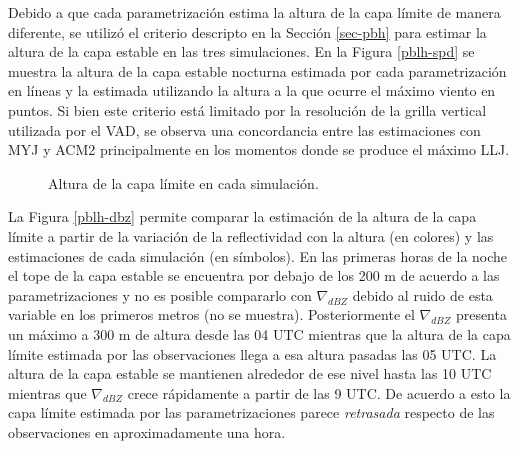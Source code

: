 \documentclass[12pt,spanish,oneside, a4paper]{book}
\begin{document}
Debido a que cada parametrización estima la altura de la capa límite de
manera diferente, se utilizó el criterio descripto en la Sección
\ref{sec-pbh} para estimar la altura de la capa estable en las tres
simulaciones. En la Figura \ref{pblh-spd} se muestra la altura de la
capa estable nocturna estimada por cada parametrización en líneas y la
estimada utilizando la altura a la que ocurre el máximo viento en
puntos. Si bien este criterio está limitado por la resolución de la
grilla vertical utilizada por el VAD, se observa una concordancia entre
las estimaciones con MYJ y ACM2 principalmente en los momentos donde se
produce el máximo LLJ.

\begin{figure}

{\centering {}\newline{}

}

\caption{Altura de la capa límite en cada simulación. \label{pblh-wrf}}\label{fig:pblh-wrf}
\end{figure}

La Figura \ref{pblh-dbz} permite comparar la estimación de la altura de
la capa límite a partir de la variación de la reflectividad con la
altura (en colores) y las estimaciones de cada simulación (en símbolos).
En las primeras horas de la noche el tope de la capa estable se
encuentra por debajo de los 200 m de acuerdo a las parametrizaciones y
no es posible compararlo con \(\nabla_{dBZ}\) debido al ruido de esta
variable en los primeros metros (no se muestra). Posteriormente el
\(\nabla_{dBZ}\) presenta un máximo a 300 m de altura desde las 04 UTC
mientras que la altura de la capa límite estimada por las observaciones
llega a esa altura pasadas las 05 UTC. La altura de la capa estable se
mantienen alrededor de ese nivel hasta las 10 UTC mientras que
\(\nabla_{dBZ}\) crece rápidamente a partir de las 9 UTC. De acuerdo a
esto la capa límite estimada por las parametrizaciones parece
\emph{retrasada} respecto de las observaciones en aproximadamente una
hora.
\end{document}
